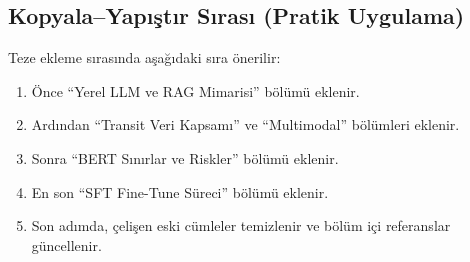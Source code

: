 \subsection{Kopyala--Yapıştır Sırası (Pratik Uygulama)}

Teze ekleme sırasında aşağıdaki sıra önerilir:
\begin{enumerate}
    \item Önce ``Yerel LLM ve RAG Mimarisi'' bölümü eklenir.
    \item Ardından ``Transit Veri Kapsamı'' ve ``Multimodal'' bölümleri eklenir.
    \item Sonra ``BERT Sınırlar ve Riskler'' bölümü eklenir.
    \item En son ``SFT Fine-Tune Süreci'' bölümü eklenir.
    \item Son adımda, çelişen eski cümleler temizlenir ve bölüm içi referanslar güncellenir.
\end{enumerate}
